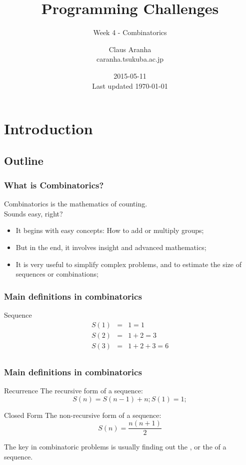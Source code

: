 \documentclass{beamer}
\title[]{Programming Challenges}
\subtitle[]{Week 4 - Combinatorics}
\author[Claus Aranha]{Claus Aranha\\{\footnotesize caranha\@@cs.tsukuba.ac.jp}}
\institute{College of Information Sciences}
\date{2015-05-11\\{\tiny Last updated \today}}
\begin{document}
\section{Introduction}
\subsection{Outline}

\begin{frame}
\maketitle
\end{frame}

\begin{frame}
  \frametitle{What is Combinatorics?}
  \begin{block}{}
    Combinatorics is the mathematics of counting.\\
    \hfill{\tiny Sounds easy, right?}
  \end{block}

  \begin{itemize}
  \item It begins with easy concepts: How to add or multiply groups;
  \item But in the end, it involves insight and advanced mathematics;
  \item It is very useful to simplify complex problems, and to
    estimate the size of sequences or combinations;
  \end{itemize}
\end{frame}

\begin{frame}
  \frametitle{Main definitions in combinatorics}
  {\small
  \begin{block}{Sequence}
    \begin{eqnarray*}
      S(1) &=& 1 = 1\\
      S(2) &=& 1 + 2 = 3\\
      S(3) &=& 1 + 2 + 3 = 6\\
    \end{eqnarray*}
  \end{block}}
\end{frame}

\begin{frame}
  \frametitle{Main definitions in combinatorics}
  {\small
  \begin{block}{Recurrence}
    The recursive form of a sequence:
    \begin{equation*}
      S(n) = S(n-1)+n; S(1) = 1;
    \end{equation*}
  \end{block}
  \begin{block}{Closed Form}
    The non-recursive form of a sequence:
    \begin{equation*}
      S(n) = \frac{n(n+1)}{2}
    \end{equation*}
  \end{block}
  } 

  The key in combinatoric problems is usually finding out the
  , or the  of a
  sequence.
\end{frame}
\end{document}
